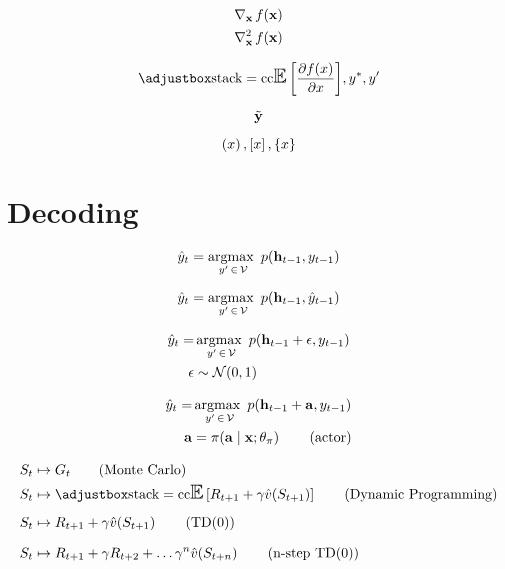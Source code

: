 \documentclass[a4paper,11pt]{article}
\begin{document}
\begin{align*}
	\grad{f}{\ve{x}}{\ve{x}} \\
	\gradn{f}{\ve{x}}{\ve{x}}{2}
\end{align*}

\begin{equation}
	{\applyb{\expect}{\pd{\apply{f}{x}}{x}}}, \optm{y}, \idx{y}
\end{equation}


\begin{equation}
	\local{\ve{y}}
\end{equation}

\begin{equation}
	\prth{x}, \brkt{x}, \crly{x}
\end{equation}

\section{Decoding} %
\label{sec:decoding}

\begin{equation}
	\pred{y}_{t} = \argmax_{\idx{y}\isin\set{V}} \pr{\ve{h}_{t-1},y_{t-1}}
\end{equation}

\begin{equation}
	\pred{y}_{t} = \argmax_{\idx{y}\isin\set{V}} \pr{\ve{h}_{t-1},\pred{y}_{t-1}}
\end{equation}

\begin{align}
	\pred{y}_{t} =& \argmax_{\idx{y}\isin\set{V}} \pr{\ve{h}_{t-1}+\epsilon,y_{t-1}} \\
	\epsilon&\obey\gaussian{0}{1}
\end{align}

\newcommand{\actor}[3]{\apply{\pi}{#2 \mid #1;\theta_{#3}}}

\begin{align}
	\pred{y}_{t} =& \argmax_{\idx{y}\isin\set{V}} \pr{\ve{h}_{t-1}+\ve{a},y_{t-1}} \\
	\ve{a} &= \actor{\ve{x}}{\ve{a}}{\pi} \tag{actor}
\end{align}


\begin{align*}
	S_{t} & \aprx G_{t} \tag{Monte Carlo} \\
	S_{t} & \aprx \applyb{\expect}{R_{t+1}+\gamma\apply{\pred{v}}{S_{t+1}}} \tag{Dynamic Programming}\\
	S_{t} & \aprx R_{t+1}+\gamma\apply{\pred{v}}{S_{t+1}} \tag{TD(0)} \\
	S_{t} & \aprx R_{t+1}+\gamma R_{t+2}+\dots \gamma^{n}\apply{\pred{v}}{S_{t+n}} \tag{n-step TD(0)}
\end{align*}
\end{document}

